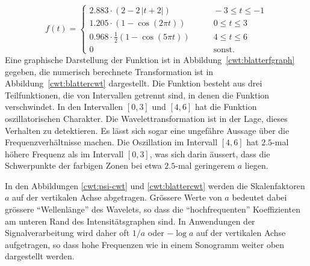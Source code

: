 \begin{beispiel}
\begin{equation}
f(t) = \begin{cases}
2.883 \cdot (2 - 2\,|t+2|)&\qquad -3\le t \le -1\\
1.205\cdot (1-\cos(2\pi t))&\qquad 0\le t \le 3\\
0.968\cdot \frac12(1-\cos(5\pi t))&\qquad 4\le t \le 6\\
0&\qquad\text{sonst.}
\end{cases}
\label{cwt:blatterf}
\end{equation}
Eine graphische Darstellung der Funktion ist in
Abbildung~\ref{cwt:blatterfgraph} gegeben,
die numerisch berechnete Transformation ist in Abbildung~\ref{cwt:blattercwt}
dargestellt.
Die Funktion besteht aus drei Teilfunktionen, die von Intervallen getrennt sind,
in denen die Funktion verschwindet.
In den Intervallen $[0,3]$ und $[4,6]$ hat die Funktion oszillatorischen
Charakter.
Die Wavelettransformation ist in der Lage, dieses Verhalten zu detektieren.
Es lässt sich sogar eine ungefähre Aussage über die Frequenzverhältnisse
machen.
Die Oszillation im Intervall $[4,6]$ hat $2.5$-mal höhere Frequenz als im
Intervall $[0,3]$, was sich darin äussert, dass die Schwerpunkte der farbigen
Zonen bei etwa $2.5$-mal geringerem $a$ liegen.
\end{beispiel}

In den Abbildungen \ref{cwt:psi-cwt} und \ref{cwt:blattercwt} werden 
die Skalenfaktoren $a$ auf der vertikalen Achse abgetragen.
Grössere Werte von $a$ bedeutet dabei grössere ``Wellenlänge'' des Wavelets,
so dass die ``hochfrequenten'' Koeffizienten am unteren Rand des
Intensitätsgraphen sind.
In Anwendungen der Signalverarbeitung wird daher oft $1/a$ oder $-\log a$ 
auf der vertikalen Achse aufgetragen, so dass hohe Frequenzen wie in
einem Sonogramm weiter oben dargestellt werden.
%

